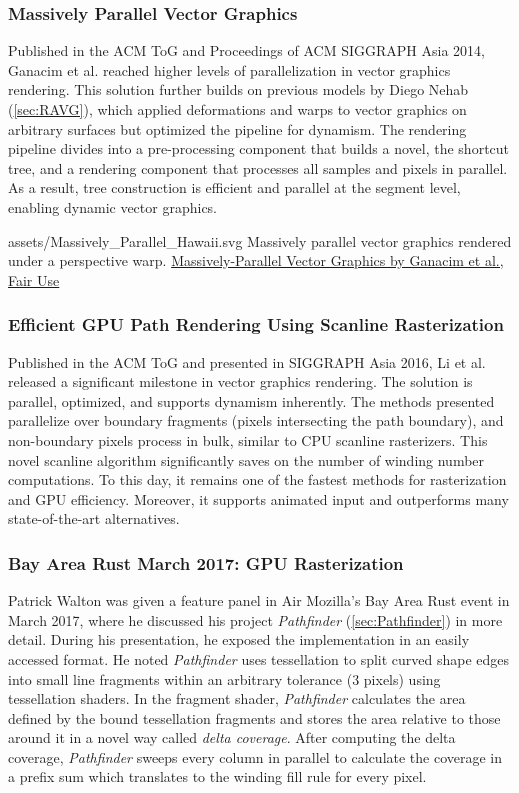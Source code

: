 \subsubsection{Massively Parallel Vector Graphics}\cite{Ganacim14}
Published in the ACM ToG and Proceedings of ACM SIGGRAPH Asia 2014, Ganacim et al. reached higher levels of parallelization in vector graphics rendering. This solution further builds on previous models by Diego Nehab (\cref{sec:RAVG}), which applied deformations and warps to vector graphics on arbitrary surfaces but optimized the pipeline for dynamism. The rendering pipeline divides into a pre-processing component that builds a novel, the shortcut tree, and a rendering component that processes all samples and pixels in parallel. As a result, tree construction is efficient and parallel at the segment level, enabling dynamic vector graphics.

\widesvg
{assets/Massively_Parallel_Hawaii.svg}
{Massively parallel vector graphics rendered under a perspective warp.}
{\href{https://w3.impa.br/~diego/projects/GanEtAl14/index.html}{Massively-Parallel Vector Graphics by Ganacim et al., Fair Use}}\medskip

\subsubsection{Efficient GPU Path Rendering Using Scanline Rasterization}\label{sec:scanline_vg}\cite{Li16}
Published in the ACM ToG and presented in SIGGRAPH Asia 2016, Li et al. released a significant milestone in vector graphics rendering. The solution is parallel, optimized, and supports dynamism inherently. The methods presented parallelize over boundary fragments (pixels intersecting the path boundary), and non-boundary pixels process in bulk, similar to CPU scanline rasterizers. This novel scanline algorithm significantly saves on the number of winding number computations. To this day, it remains one of the fastest methods for rasterization and GPU efficiency. Moreover, it supports animated input and outperforms many state-of-the-art alternatives.

\subsubsection{Bay Area Rust March 2017: GPU Rasterization}\cite{Walton18}
Patrick Walton was given a feature panel in Air Mozilla's Bay Area Rust event in March 2017, where he discussed his project \textit{Pathfinder} (\cref{sec:Pathfinder}) in more detail. During his presentation, he exposed the implementation in an easily accessed format. He noted \textit{Pathfinder} uses tessellation to split curved shape edges into small line fragments within an arbitrary tolerance (3 pixels) using tessellation shaders. In the fragment shader, \textit{Pathfinder} calculates the area defined by the bound tessellation fragments and stores the area relative to those around it in a novel way called \textit{delta coverage}. After computing the delta coverage, \textit{Pathfinder} sweeps every column in parallel to calculate the coverage in a prefix sum which translates to the winding fill rule for every pixel.

